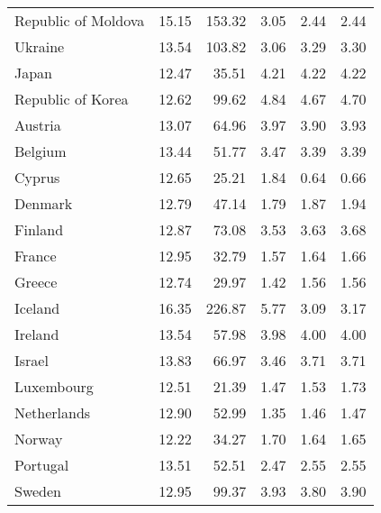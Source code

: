\begin{longtable}{lrrrrr}
        Republic of Moldova &      15.15 &    153.32 &       3.05 &        2.44 &         2.44 \\
                    Ukraine &      13.54 &    103.82 &       3.06 &        3.29 &         3.30 \\
                      Japan &      12.47 &     35.51 &       4.21 &        4.22 &         4.22 \\
          Republic of Korea &      12.62 &     99.62 &       4.84 &        4.67 &         4.70 \\
                    Austria &      13.07 &     64.96 &       3.97 &        3.90 &         3.93 \\
                    Belgium &      13.44 &     51.77 &       3.47 &        3.39 &         3.39 \\
                     Cyprus &      12.65 &     25.21 &       1.84 &        0.64 &         0.66 \\
                    Denmark &      12.79 &     47.14 &       1.79 &        1.87 &         1.94 \\
                    Finland &      12.87 &     73.08 &       3.53 &        3.63 &         3.68 \\
                     France &      12.95 &     32.79 &       1.57 &        1.64 &         1.66 \\
                     Greece &      12.74 &     29.97 &       1.42 &        1.56 &         1.56 \\
                    Iceland &      16.35 &    226.87 &       5.77 &        3.09 &         3.17 \\
                    Ireland &      13.54 &     57.98 &       3.98 &        4.00 &         4.00 \\
                     Israel &      13.83 &     66.97 &       3.46 &        3.71 &         3.71 \\
                 Luxembourg &      12.51 &     21.39 &       1.47 &        1.53 &         1.73 \\
                Netherlands &      12.90 &     52.99 &       1.35 &        1.46 &         1.47 \\
                     Norway &      12.22 &     34.27 &       1.70 &        1.64 &         1.65 \\
                   Portugal &      13.51 &     52.51 &       2.47 &        2.55 &         2.55 \\
                     Sweden &      12.95 &     99.37 &       3.93 &        3.80 &         3.90 \\

\end{longtable}
